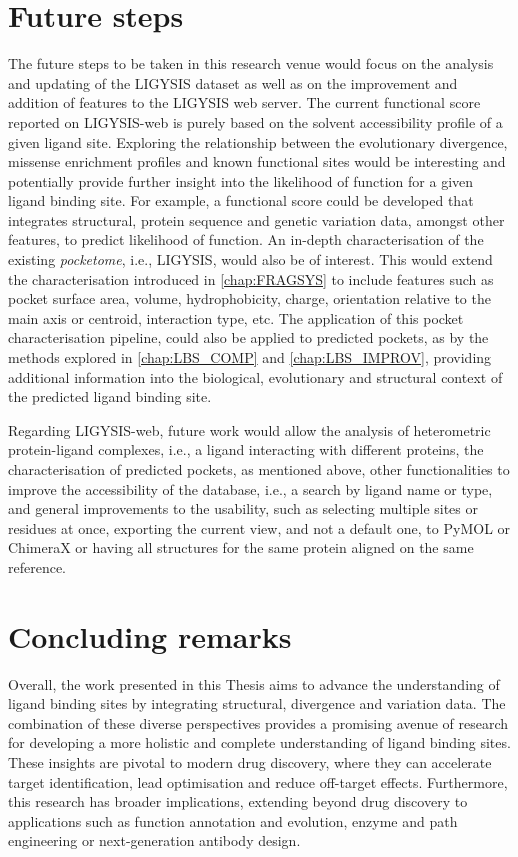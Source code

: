 \section{Future steps}

The future steps to be taken in this research venue would focus on the analysis and updating of the LIGYSIS dataset as well as on the improvement and addition of features to the LIGYSIS web server. The current functional score reported on LIGYSIS-web is purely based on the solvent accessibility profile of a given ligand site. Exploring the relationship between the evolutionary divergence, missense enrichment profiles and known functional sites would be interesting and potentially provide further insight into the likelihood of function for a given ligand binding site. For example, a functional score could be developed that integrates structural, protein sequence and genetic variation data, amongst other features, to predict likelihood of function. An in-depth characterisation of the existing \textit{pocketome}, i.e., LIGYSIS, would also be of interest. This would extend the characterisation introduced in \autoref{chap:FRAGSYS} to include features such as pocket surface area, volume, hydrophobicity, charge, orientation relative to the main axis or centroid, interaction type, etc. The application of this pocket characterisation pipeline, could also be applied to predicted pockets, as by the methods explored in \autoref{chap:LBS_COMP} and \autoref{chap:LBS_IMPROV}, providing additional information into the biological, evolutionary and structural context of the predicted ligand binding site.

Regarding LIGYSIS-web, future work would allow the analysis of heterometric protein-ligand complexes, i.e., a ligand interacting with different proteins, the characterisation of predicted pockets, as mentioned above, other functionalities to improve the accessibility of the database, i.e., a search by ligand name or type, and general improvements to the usability, such as selecting multiple sites or residues at once, exporting the current view, and not a default one, to PyMOL \cite{SCHRODINGER_2015_PYMOL} or ChimeraX \cite{PETTERSEN_2021_CHIMERAX} or having all structures for the same protein aligned on the same reference.

\section{Concluding remarks}

Overall, the work presented in this Thesis aims to advance the understanding of ligand binding sites by integrating structural, divergence and variation data. The combination of these diverse perspectives provides a promising avenue of research for developing a more holistic and complete understanding of ligand binding sites. These insights are pivotal to modern drug discovery, where they can accelerate target identification, lead optimisation and reduce off-target effects. Furthermore, this research has broader implications, extending beyond drug discovery to applications such as function annotation and evolution, enzyme and path engineering or next-generation antibody design.